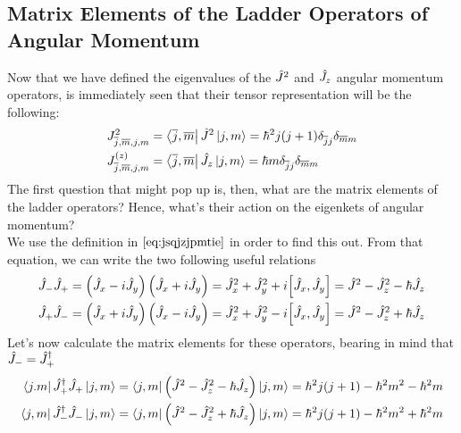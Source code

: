 \documentclass[../qm.tex]{subfiles}
\begin{document}
	\subsection{Matrix Elements of the Ladder Operators of Angular Momentum}
	Now that we have defined the eigenvalues of the $\hat{J}^2$ and $\hat{J}_z$ angular momentum operators, is immediately seen that their tensor representation will be the following:
	\begin{equation}
		\begin{aligned}
			J^2_{\overline{j},\overline{m},j,m}&=\bra{\overline{j},\overline{m}}\hat{J}^2\ket{j,m}=\hbar^2j(j+1)\delta_{\overline{j}j}\delta_{\overline{m}m}\\
			J^{(z)}_{\overline{j},\overline{m},j,m}&=\bra{\overline{j},\overline{m}}\hat{J}_z\ket{j,m}=\hbar m\delta_{\overline{j}j}\delta_{\overline{m}m}
		\end{aligned}
		\label{eq:matrixelementsangmomop}
	\end{equation}
	The first question that might pop up is, then, what are the matrix elements of the ladder operators? Hence, what's their action on the eigenkets of angular momentum?\\
	We use the definition in $\eqref{eq:jsqjzjpmtie}$ in order to find this out. From that equation, we can write the two following useful relations
	\begin{equation}%
		\begin{aligned}
			\ladoprd{J}\ladopru{J}&=\left( \opr{J}_x-i\opr{J}_y \right)\left( \opr{J}_x+i\opr{J}_y \right)=\opr{J}_x^2+\opr{J}_y^2+i\comm{\opr{J}_x}{\opr{J}_y}=\opr{J}^2-\opr{J}_z^2-\hbar\opr{J}_z\\
			\ladopru{J}\ladoprd{J}&=\left( \opr{J}_x+i\opr{J}_y \right)\left( \opr{J}_x-i\opr{J}_y \right)=\opr{J}_x^2+\opr{J}_y^2-i\comm{\opr{J}_x}{\opr{J}_y}=\opr{J}^2-\opr{J}_z^2+\hbar\opr{J}_z
		\end{aligned}
		\label{eq:ladoprudprod}
	\end{equation}
	Let's now calculate the matrix elements for these operators, bearing in mind that $\hat{J}_{-}=\hat{J}^{\dagger}_+$
	\begin{equation}
		\begin{aligned}
			\bra{j.m}\hat{J}^{\dagger}_+\hat{J}_{+}\ket{j,m}&=\bra{j,m}\left( \hat{J}^2-\hat{J}^2_z-\hbar\hat{J}_z \right)\ket{j,m}=\hbar^2j(j+1)-\hbar^2m^2-\hbar^2m\\
			\bra{j,m}\hat{J}^{\dagger}_-\hat{J}_{-}\ket{j,m}&=\bra{j,m}\left( \hat{J}^2-\hat{J}^2_z+\hbar\hat{J}_z \right)\ket{j,m}=\hbar^2j(j+1)-\hbar^2m^2+\hbar^2m
		\end{aligned}
		\label{eq:matrixelements}
	\end{equation}
\end{document}
